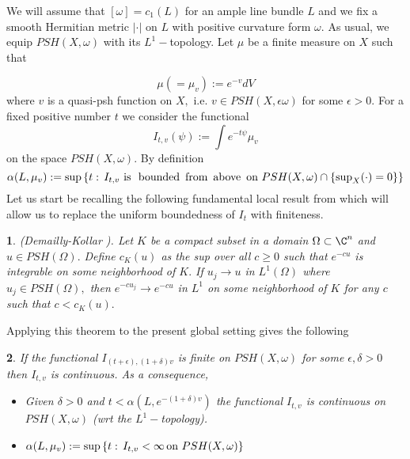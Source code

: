 \documentclass[11pt,oneside,english]{amsart}
\numberwithin{equation}{section}
\numberwithin{figure}{section}
\theoremstyle{plain}
\newtheorem{thm}{\protect\theoremname}[section]
\theoremstyle{plain}
\newtheorem{cor}[thm]{\protect\corollaryname}
\theoremstyle{plain}
\theoremstyle{plain}
\theoremstyle{remark}
\theoremstyle{definition}
\providecommand{\corollaryname}{Corollary}
\providecommand{\theoremname}{Theorem}
\begin{document}
We will assume that $[\omega]=c_{1}(L)$ for an ample line bundle
$L$ and we fix a smooth Hermitian metric $|\cdot|$ on $L$ with
positive curvature form $\omega.$ As usual, we equip $PSH(X,\omega)$
with its $L^{1}-$topology. Let $\mu$ be a finite measure on $X$
such that 

\begin{equation}
\mu(=\mu_{v}):=e^{-v}dV\label{eq:m delta in append}
\end{equation}
where $v$ is a quasi-psh function on $X,$ i.e. $v\in PSH(X,\epsilon\omega)$
for some $\epsilon>0.$ For a fixed positive number $t$ we consider
the functional 
\[
I_{t,v}(\psi):=\int e^{-t\psi}\mu_{v}
\]
 on the space $PSH(X,\omega).$ By definition 
\[
\alpha(L,\mu_{v}):=\sup\left\{ t:\, I_{t,v}\,\,\mbox{is\,\,\ bounded\,\ from\,\ above\,\ on \ensuremath{PSH(X,\omega)\cap\{\sup_{X}(\cdot)=0\}}}\right\} 
\]
Let us start be recalling the following fundamental local result from
\cite{d-j} which will allow us to replace the uniform boundedness
of $I_{t}$ with finiteness.
\begin{thm}
\label{thm:(Demailly-Kollar-).-Let}(Demailly-Kollar ). Let $K$ be
a compact subset in a domain $\Omega\subset\C^{n}$ and $u\in PSH(\Omega).$
Define $c_{K}(u)$ as the sup over all $c\geq0$ such that $e^{-cu}$
is integrable on some neighborhood of $K.$ If $u_{j}\rightarrow u$
in $L^{1}(\Omega)$ where $u_{j}\in PSH(\Omega),$ then $e^{-cu_{j}}\rightarrow e^{-cu}$
in $L^{1}$ on some neighborhood of $K$ for any $c$ such that $c<c_{K}(u).$ 
\end{thm}
Applying this theorem to the present global setting gives the following 
\begin{cor}
\label{cor:If-the-functional}\label{cor:global cont of exp int}If
the functional $I_{(t+\epsilon),(1+\delta)v}$ is finite on $PSH(X,\omega)$
for some $\epsilon,\delta>0$ then $I_{t,v}$ is continuous. As a
consequence, 
\begin{itemize}
\item Given $\delta>0$ and $t<\alpha(L,e^{-(1+\delta)v})$ the functional
$I_{t,v}$ is continuous on $PSH(X,\omega)$ (wrt the $L^{1}-$topology). 
\item $\alpha(L,\mu_{v}):=\sup\left\{ t:\, I_{t,v}<\infty\,\mbox{on \ensuremath{PSH(X,\omega)}}\right\} $ 
\end{itemize}
\end{cor}
\end{document}
